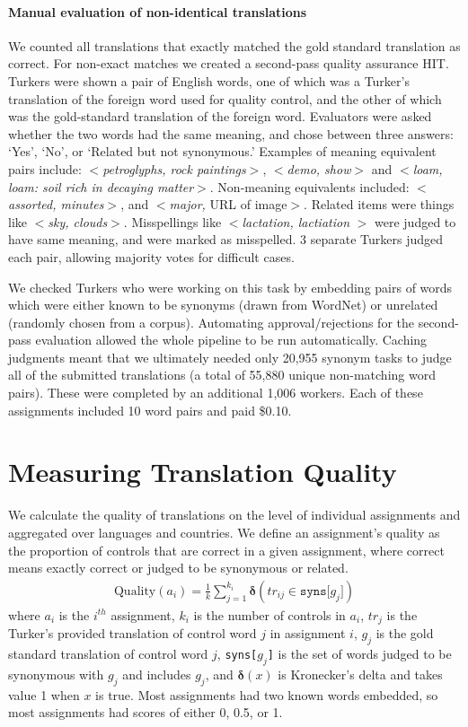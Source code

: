 \documentclass[11pt]{article}
\begin{document}
\paragraph{Manual evaluation of non-identical translations}
We counted all translations that exactly matched the gold standard translation as correct.  For non-exact matches we created a second-pass quality assurance HIT.  
Turkers were shown a pair of English words, one of which was a Turker's translation of the foreign word used for quality control, and the other of which was the gold-standard translation of the foreign word. Evaluators were asked whether the two words had the same meaning, and chose between three answers: `Yes', `No', or `Related but not synonymous.'  Examples of meaning equivalent pairs include: $<${\it petroglyphs, rock paintings}$>$, $<${\it demo, show}$>$ and  $<${\it loam, loam: soil rich in decaying matter}$>$.  Non-meaning equivalents included: $<${\it assorted, minutes}$>$, and $<${\it major,} URL of image$>$.  Related items were things like $<${\it sky, clouds}$>$. Misspellings like $<${\it lactation, lactiation} $>$ were judged to have same meaning, and were marked as misspelled.   3 separate Turkers judged each pair, allowing majority votes for difficult cases. 


We checked Turkers who were working on this task by embedding pairs of words which were either known to be synonyms (drawn from WordNet) or  unrelated (randomly chosen from a corpus). 
Automating approval/rejections for the second-pass evaluation allowed the whole pipeline to be run automatically.  Caching judgments meant that we ultimately needed only 
20,955 synonym tasks to judge all of the submitted translations (a total of 55,880 unique non-matching word pairs).  These were completed by an additional 1,006 workers.  Each of these assignments included 10 word pairs and paid \$0.10.



\section{Measuring Translation Quality}

We calculate the quality of translations on the level of individual assignments and aggregated over languages and countries.  We define an assignment's quality as the proportion of controls that are correct in a given assignment, where correct means exactly correct or judged to be synonymous or related.
\begin{align}	
	\text{Quality}(a_i) = \frac{1}{k}\sum\limits_{j=1}^{k_i}\mathbf{\delta}(tr_{ij} \in \texttt{syns[$g_j$]})
\end{align}	
where $a_i$ is the $i^{th}$ assignment, $k_i$ is the number of controls in $a_i$, $tr_j$ is the Turker's provided translation of control word $j$ in assignment $i$, $g_j$ is the gold standard translation of control word $j$, \texttt{syns[$g_j$]} is the set of words judged to be synonymous with $g_j$ and includes $g_j$, and $\mathbf{\delta}(x)$ is Kronecker's delta and takes value 1 when $x$ is true. 
Most assignments had two known words embedded, so most assignments had scores of either 0, 0.5, or 1. 
\end{document}

